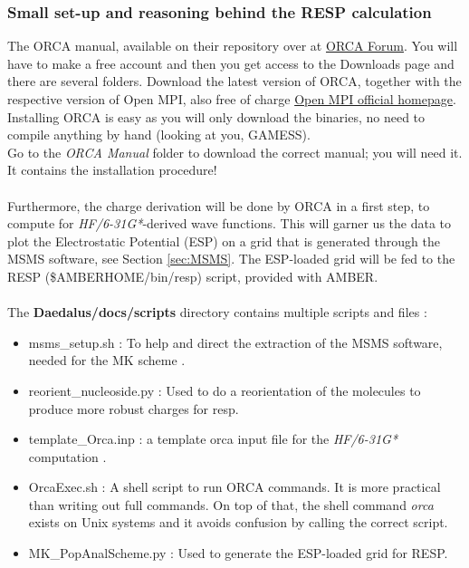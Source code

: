 \documentclass[a4paper]{article}
\begin{document}
\subsubsection{Small set-up and reasoning behind the RESP calculation}\label{sec:respdocs}
The ORCA manual, available on their repository over at \href{https://orcaforum.kofo.mpg.de/app.php/portal}{ORCA Forum}. You will have to make a free account and then you get access to the Downloads page and there are several folders. Download the latest version of ORCA, together with the respective version of Open MPI, also free of charge \href{https://www.open-mpi.org/}{Open MPI official homepage}. Installing ORCA is easy as you will only download the binaries, no need to compile anything by hand (looking at you, GAMESS).\\
Go to the \textit{ORCA Manual} folder to download the correct manual; you will need it. It contains the installation procedure!\\
\\
Furthermore, the charge derivation will be done by ORCA in a first step, to compute for \textit{HF/6-31G*}-derived wave functions. This will garner us the data to plot the Electrostatic Potential (ESP) on a grid that is generated through the MSMS software, see Section \ref{sec:MSMS}. The ESP-loaded grid will be fed to the RESP (\$AMBERHOME/bin/resp) script, provided with AMBER. \\
\\
The \textbf{Daedalus/docs/scripts} directory contains multiple scripts and files : 
\begin{itemize}
    \item msms\_setup.sh : To help and direct the extraction of the MSMS software, needed for the MK scheme .
    \item reorient\_nucleoside.py : Used to do a reorientation of the molecules to produce more robust charges for resp.
    \item template\_Orca.inp : a template orca input file for the \textit{HF/6-31G*} computation .
    \item OrcaExec.sh : A shell script to run ORCA commands. It is more practical than writing out full commands. On top of that, the shell command \textit{orca} exists on Unix systems and it avoids confusion by calling the correct script.
    \item MK\_PopAnalScheme.py : Used to generate the ESP-loaded grid for RESP.
\end{itemize}
%
\vspace{3mm}
\end{document}
